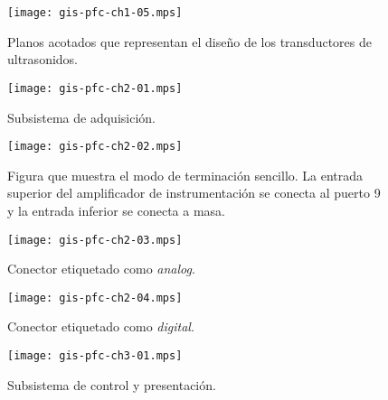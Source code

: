 \documentclass[a4paper,12pt]{article}
\begin{document}
\begin{figure}
	\begin{center}
		\texttt{[image: gis-pfc-ch1-05.mps]}
	\end{center}
	\caption[Transductores de ultrasonidos]{Planos acotados que representan el diseño de los
	transductores de ultrasonidos.}
	\label{fig:transducers}
\end{figure}

\begin{figure}
	\begin{center}
		\texttt{[image: gis-pfc-ch2-01.mps]}
	\end{center}
	\caption[Subsistema de adquisición]{Subsistema de adquisición.}
	\label{fig:subacqui}
\end{figure}

\begin{figure}
	\begin{center}
		\texttt{[image: gis-pfc-ch2-02.mps]}
	\end{center}
	\caption[Ejemplo de configuración de terminación]{Figura que muestra el modo de terminación sencillo. La entrada superior del amplificador de instrumentación se conecta al puerto 9 y la entrada inferior se conecta a masa.}
	\label{fig:termmodes}
\end{figure}

\clearpage

\begin{figure}
	\begin{center}
		\texttt{[image: gis-pfc-ch2-03.mps]}
	\end{center}
	\caption[Conector etiquetado como \emph{analog}]{Conector etiquetado como \emph{analog}.}
	\label{fig:analog}
\end{figure}

\begin{figure}
	\begin{center}
		\texttt{[image: gis-pfc-ch2-04.mps]}
	\end{center}
	\caption[Conector etiquetado como \emph{digital}]{Conector etiquetado como \emph{digital}.}
	\label{fig:digital}
\end{figure}

\begin{figure}
	\begin{center}
		\texttt{[image: gis-pfc-ch3-01.mps]}
	\end{center}
	\caption[Subsistema de control y presentación]{Subsistema de control y presentación.}
	\label{sub:control}
\end{figure}
\end{document}
